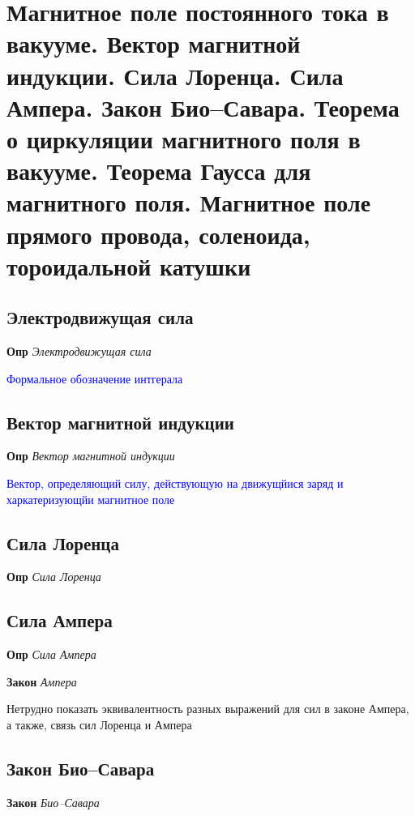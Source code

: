 \documentclass[a4paper, 14pt]{article}
\begin{document}
    \section{Магнитное поле постоянного тока в вакууме.
    Вектор магнитной индукции.
    Сила Лоренца.
    Сила Ампера.
    Закон Био–Савара.
    Теорема о циркуляции магнитного поля в вакууме.
    Теорема Гаусса для магнитного поля.
    Магнитное поле прямого провода, соленоида, тороидальной катушки}
    
    \subsection{Электродвижущая сила}
    
    \textbf{Опр} \textit{Электродвижущая сила}
    
    \textcolor{blue}{Формальное обозначение интгерала}
    
    \subsection{Вектор магнитной индукции}
    
    \textbf{Опр} \textit{Вектор магнитной индукции}
    
    \textcolor{blue}{Вектор, определяющий силу, действующую на движущйися заряд и харкатеризующйи магнитное поле}
    
    \subsection{Сила Лоренца}
    
    \textbf{Опр} \textit{Сила Лоренца}
    
    \subsection{Сила Ампера}
    
    \textbf{Опр} \textit{Сила Ампера}
    
    \textbf{Закон} \textit{Ампера}
    
    Нетрудно показать эквивалентность разных выражений для сил в законе Ампера, а также, связь сил Лоренца и Ампера
    
    \subsection{Закон Био–Савара}
    
    \textbf{Закон} \textit{Био–Савара}
    
\end{document}
